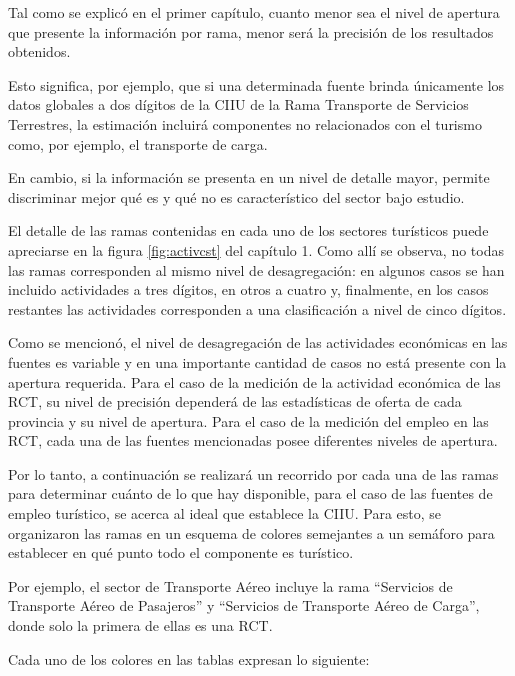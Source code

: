 \documentclass[
  openany]{book}
\begin{document}
Tal como se explicó en el primer capítulo, cuanto menor sea el nivel de apertura que presente la información por rama, menor será la precisión de los resultados obtenidos.

Esto significa, por ejemplo, que si una determinada fuente brinda únicamente los datos globales a dos dígitos de la CIIU de la Rama Transporte de Servicios Terrestres, la estimación incluirá componentes no relacionados con el turismo como, por ejemplo, el transporte de carga.

En cambio, si la información se presenta en un nivel de detalle mayor, permite discriminar mejor qué es y qué no es característico del sector bajo estudio.

El detalle de las ramas contenidas en cada uno de los sectores turísticos puede apreciarse en la figura \ref{fig:activcst} del capítulo 1. Como allí se observa, no todas las ramas corresponden al mismo nivel de desagregación: en algunos casos se han incluido actividades a tres dígitos, en otros a cuatro y, finalmente, en los casos restantes las actividades corresponden a una clasificación a nivel de cinco dígitos.

Como se mencionó, el nivel de desagregación de las actividades económicas en las fuentes es variable y en una importante cantidad de casos no está presente con la apertura requerida. Para el caso de la medición de la actividad económica de las RCT, su nivel de precisión dependerá de las estadísticas de oferta de cada provincia y su nivel de apertura. Para el caso de la medición del empleo en las RCT, cada una de las fuentes mencionadas posee diferentes niveles de apertura.

Por lo tanto, a continuación se realizará un recorrido por cada una de las ramas para determinar cuánto de lo que hay disponible, para el caso de las fuentes de empleo turístico, se acerca al ideal que establece la CIIU. Para esto, se organizaron las ramas en un esquema de colores semejantes a un semáforo para establecer en qué punto todo el componente es turístico.

Por ejemplo, el sector de Transporte Aéreo incluye la rama ``Servicios de Transporte Aéreo de Pasajeros'' y ``Servicios de Transporte Aéreo de Carga'', donde solo la primera de ellas es una RCT.

Cada uno de los colores en las tablas expresan lo siguiente:
\end{document}
